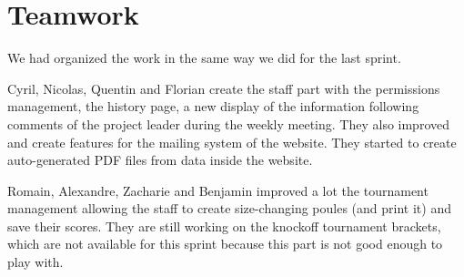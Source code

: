 \section{Teamwork}

We had organized the work in the same way we did for the last sprint. \newline

Cyril, Nicolas, Quentin and Florian create the staff part with the permissions management, the history page, a new display of the information following comments of the project leader during the weekly meeting. They also improved and create features for the mailing system of the website. They started to create auto-generated PDF files from data inside the website. \newline

Romain, Alexandre, Zacharie and Benjamin improved a lot the tournament management allowing the staff to create size-changing poules (and print it) and save their scores. They are still working on the knockoff tournament brackets, which are not available for this sprint because this part is not good enough to play with. \newline
